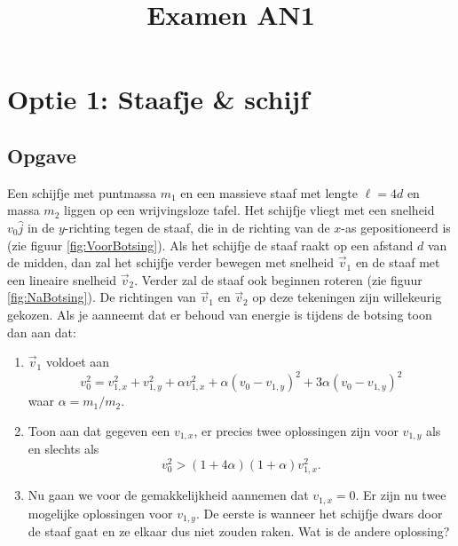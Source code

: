 \documentclass[a4paper,11pt]{article}
\title{Examen AN1}
\begin{document}
\section*{Optie 1: Staafje \& schijf}
\subsection*{Opgave}
Een schijfje met puntmassa $m_1$ en een massieve staaf met lengte $\ell=4d$ en massa $m_2$ liggen op een wrijvingsloze tafel. Het schijfje vliegt met een snelheid $v_0 \hat{j}$ in de $y$-richting tegen de staaf, die in de richting van de $x$-as gepositioneerd is (zie figuur \ref{fig:VoorBotsing}). Als het schijfje de staaf raakt op een afstand $d$ van de midden, dan zal het schijfje verder bewegen met snelheid $\vec{v}_1$ en de staaf met een lineaire snelheid $\vec{v}_2$. Verder zal de staaf ook beginnen roteren (zie figuur \ref{fig:NaBotsing}). De richtingen van $\vec v_1$ en $\vec v_2$ op deze tekeningen zijn willekeurig gekozen. Als je aanneemt dat er behoud van energie is tijdens de botsing toon dan aan dat:
\begin{enumerate}[label=(\alph*)]
	\item $\vec{v}_1$ voldoet aan
	\begin{equation}
		v_0^2=v_{1,x}^2+v_{1,y}^2+\alpha v_{1,x}^2+\alpha(v_0-v_{1,y})^2+3\alpha(v_0-v_{1,y})^2
	\end{equation}
	waar $\alpha=m_1/m_2$.
	\item Toon aan dat gegeven een $v_{1,x}$, er precies twee oplossingen zijn voor $v_{1,y}$ als en slechts als
	\begin{equation}
		v_0^2>(1+4\alpha)(1+\alpha)v_{1,x}^2.
	\end{equation}
	\item Nu gaan we voor de gemakkelijkheid aannemen dat $v_{1,x}=0$. Er zijn nu twee mogelijke oplossingen voor $v_{1,y}$. De eerste is wanneer het schijfje dwars door de staaf gaat en ze elkaar dus niet zouden raken. Wat is de andere oplossing?
\end{enumerate}
\end{document}
